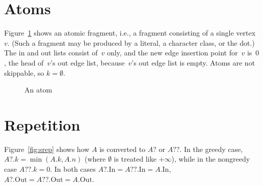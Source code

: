 \documentclass{article}
\newcommand*{\In}{\mathrm{In}}
\newcommand*{\Out}{\mathrm{Out}}
\begin{document}
\section{Atoms}

Figure~\ref{fig:atom} shows an atomic fragment, i.e., a fragment consisting of a single vertex~$v$. (Such a fragment may be produced by a literal, a character class, or the dot.) The in and out lists consist of~$v$ only, and the new edge insertion point for~$v$ is~$0$, the head of~$v$'s out edge list, because~$v$'s out edge list is empty. Atoms are not skippable, so $k = \emptyset$.

\begin{figure}
\centering
{}
\caption{An atom\label{fig:atom}}
\end{figure}

\section{Repetition}

Figure~\ref{fig:srep} shows how $A$ is converted to $A?$ or $A??$. In the greedy case, $A?.k = \min(A.k,A.n)$ (where $\emptyset$ is treated like $+\infty$), while in the nongreedy case $A??.k = 0$. In both cases $A?.\In = A??.\In = A.\In$, $A?.\Out = A??.\Out = A.\Out$.
\end{document}
